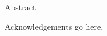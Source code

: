 \begin{abstractlong}
    Abstract
\end{abstractlong}

\begin{acknowledgementslong}
    Acknowledgements go here.
\end{acknowledgementslong}